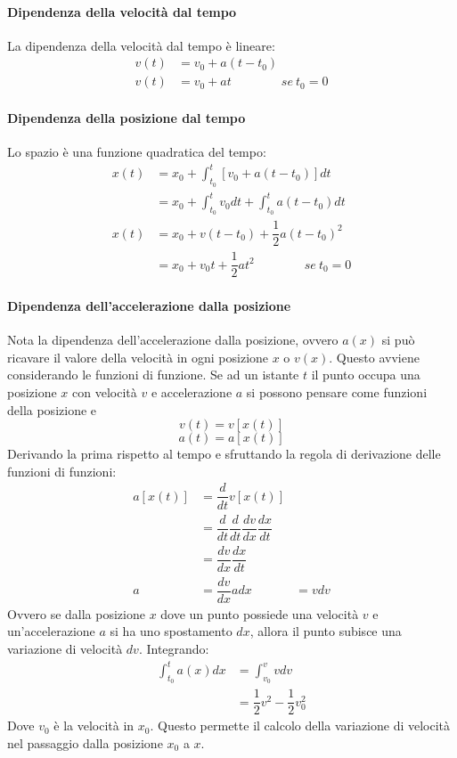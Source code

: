 			\paragraph{Dipendenza della velocit\`a dal tempo}
			La dipendenza della velocit\`a dal tempo \`e lineare:
			\begin{align*}
				v(t) &=v_0+a(t-t_0)\\
				v(t) &=v_0+at\qquad\qquad se\ t_0 = 0
			\end{align*}

			\paragraph{Dipendenza della posizione dal tempo}
			Lo spazio \`e una funzione quadratica del tempo:
			\begin{align*}
				x(t) &= x_0 +\int_{t_0}^t [v_0 + a(t-t_0)]dt\\
				     &= x_0 + \int_{t_0}^t v_0dt + \int_{t_0}^t a(t-t_0)dt\\
				x(t) &= x_0 + v(t-t_0) +\dfrac{1}{2}a(t-t_0)^2\\
				     &= x_0 + v_0t +\dfrac{1}{2}at^2\qquad\qquad se\ t_0 = 0
			\end{align*}

			\paragraph{Dipendenza dell'accelerazione dalla posizione}
			Nota la dipendenza dell'accelerazione dalla posizione, ovvero $a(x)$ si pu\`o ricavare il valore della velocit\`a in ogni posizione $x$ o $v(x)$.
			Questo avviene considerando le funzioni di funzione.
			Se ad un istante $t$ il punto occupa una posizione $x$ con velocit\`a $v$ e accelerazione $a$ si possono pensare come funzioni della posizione e
			$$v(t) = v[x(t)]$$
			$$a(t) = a[x(t)]$$
			Derivando la prima rispetto al tempo e sfruttando la regola di derivazione delle funzioni di funzioni:
			\begin{align*}
				a[x(t)] &= \dfrac{d}{dt}v[x(t)]\\
				        &= \dfrac{d}{dt}\dfrac{d}{dt}\dfrac{dv}{dx}\dfrac{dx}{dt}\\
					&= \dfrac{dv}{dx}\dfrac{dx}{dt}\\
				a  	&= \dfrac{dv}{dx}
				adx &= vdv
			\end{align*}
			Ovvero se dalla posizione $x$ dove un punto possiede una velocit\`a $v$ e un'accelerazione $a$ si ha uno spostamento $dx$, allora il punto subisce una variazione di velocit\`a $dv$.
			Integrando:
			\begin{align*}
				\int_{t_0}^t a(x)dx &= \int_{v_0}^{v} vdv\\
					       &= \dfrac{1}{2}v^2 -\dfrac{1}{2}v_0^2
			\end{align*}
			Dove $v_0$ \`e la velocit\`a in $x_0$.
			Questo permette il calcolo della variazione di velocit\`a nel passaggio dalla posizione $x_0$ a $x$.

